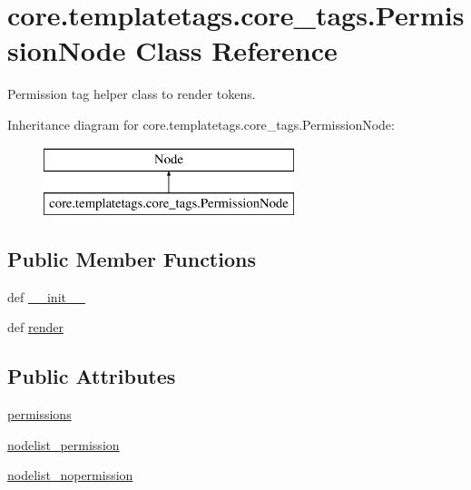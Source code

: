 \hypertarget{classcore_1_1templatetags_1_1core__tags_1_1PermissionNode}{\section{core.\-templatetags.\-core\-\_\-tags.\-Permission\-Node Class Reference}
\label{classcore_1_1templatetags_1_1core__tags_1_1PermissionNode}
}


Permission tag helper class to render tokens.  


Inheritance diagram for core.\-templatetags.\-core\-\_\-tags.\-Permission\-Node\-:\begin{figure}[H]
\begin{center}
\leavevmode
\includegraphics[height=2.000000cm]{classcore_1_1templatetags_1_1core__tags_1_1PermissionNode}
\end{center}
\end{figure}
\subsection*{Public Member Functions}
\begin{DoxyCompactItemize}
\item 
def \hyperlink{classcore_1_1templatetags_1_1core__tags_1_1PermissionNode_a42fb743243a3a57c033abb71e0b5b975}{\-\_\-\-\_\-init\-\_\-\-\_\-}
\item 
def \hyperlink{classcore_1_1templatetags_1_1core__tags_1_1PermissionNode_adda756edbbf52cf0949d91430128495a}{render}
\end{DoxyCompactItemize}
\subsection*{Public Attributes}
\begin{DoxyCompactItemize}
\item 
\hyperlink{classcore_1_1templatetags_1_1core__tags_1_1PermissionNode_a8f264cfa76767dba610e4a0b930a69e3}{permissions}
\item 
\hyperlink{classcore_1_1templatetags_1_1core__tags_1_1PermissionNode_a702425b36ea18844eee836560b3c3215}{nodelist\-\_\-permission}
\item 
\hyperlink{classcore_1_1templatetags_1_1core__tags_1_1PermissionNode_ab3b7efaa62b6ac8b71cc33ae49356b19}{nodelist\-\_\-nopermission}
\end{DoxyCompactItemize}


